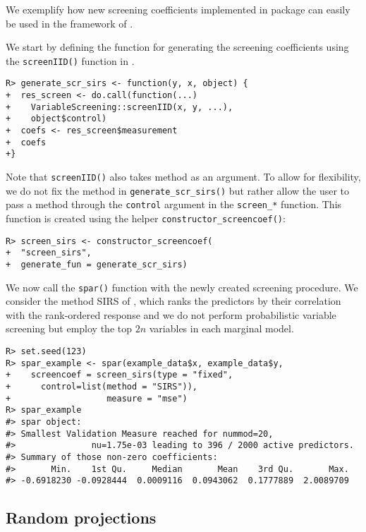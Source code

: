 \documentclass[
  article]{jss}
\begin{document}
We exemplify how new screening coefficients implemented in package
 can easily be used in the framework of
.

We start by defining the function for generating the screening
coefficients using the \texttt{screenIID()} function in
.

\begin{verbatim}
R> generate_scr_sirs <- function(y, x, object) {
+  res_screen <- do.call(function(...) 
+    VariableScreening::screenIID(x, y, ...), 
+    object$control)
+  coefs <- res_screen$measurement
+  coefs
+}
\end{verbatim}

Note that \texttt{screenIID()} also takes method as an argument. To
allow for flexibility, we do not fix the method in
\texttt{generate\_scr\_sirs()} but rather allow the user to pass a
method through the \texttt{control} argument in the \texttt{screen\_*}
function. This function is created using the helper
\texttt{constructor\_screencoef()}:

\begin{verbatim}
R> screen_sirs <- constructor_screencoef(
+  "screen_sirs", 
+  generate_fun = generate_scr_sirs)
\end{verbatim}

We now call the \texttt{spar()} function with the newly created
screening procedure. We consider the method SIRS of
\citet{zhu2011model}, which ranks the predictors by their correlation
with the rank-ordered response and we do not perform probabilistic
variable screening but employ the top \(2n\) variables in each marginal
model.

\begin{verbatim}
R> set.seed(123)      
R> spar_example <- spar(example_data$x, example_data$y,
+    screencoef = screen_sirs(type = "fixed",
+      control=list(method = "SIRS")),
+                   measure = "mse")
R> spar_example
#> spar object:
#> Smallest Validation Measure reached for nummod=20,
#>               nu=1.75e-03 leading to 396 / 2000 active predictors.
#> Summary of those non-zero coefficients:
#>       Min.    1st Qu.     Median       Mean    3rd Qu.       Max. 
#> -0.6918230 -0.0928444  0.0009116  0.0943062  0.1777889  2.0089709
\end{verbatim}

\subsection{Random projections}\label{random-projections-1}
\end{document}
